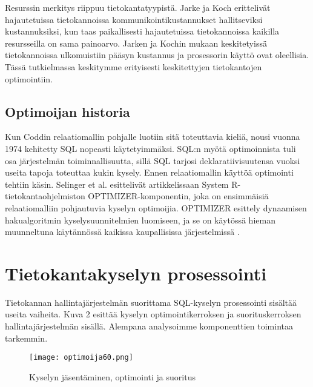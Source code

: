 \documentclass[finnish]{tktltiki2}
\theoremstyle{definition}
\theoremstyle{remark}
\begin{document}
Resurssin merkitys riippuu tietokantatyypistä. Jarke ja Koch erittelivät hajautetuissa tietokannoissa kommunikointikustannukset hallitseviksi kustannuksiksi, kun taas paikallisesti hajautetuissa tietokannoissa kaikilla resursseilla on sama painoarvo. Jarken ja Kochin mukaan keskitetyissä tietokannoissa ulkomuistiin pääsyn kustannus ja prosessorin käyttö ovat oleellisia. Tässä tutkielmassa keskitymme erityisesti keskitettyjen tietokantojen optimointiin.

\subsection{Optimoijan historia}
Kun Coddin relaatiomallin pohjalle luotiin sitä toteuttavia kieliä, nousi vuonna 1974 kehitetty SQL nopeasti käytetyimmäksi. SQL:n myötä optimoinnista tuli osa järjestelmän toiminnallisuutta, sillä SQL tarjosi deklaratiivisuutensa vuoksi useita tapoja toteuttaa kukin kysely. Ennen relaatiomallin käyttöä optimointi tehtiin käsin.
Selinger et al. esittelivät artikkelissaan \cite{selinger1979access} System R-tietokantaohjelmiston OPTIMIZER-komponentin, joka on ensimmäisiä relaatiomalliin pohjautuvia kyselyn optimoijia. OPTIMIZER esittely dynaamisen hakualgoritmin kyselysuunnitelmien luomiseen, ja se on käytössä hieman muunneltuna käytännössä kaikissa kaupallisissa järjestelmissä \cite{ioannidis1996query}. 


\section{Tietokantakyselyn prosessointi}
Tietokannan hallintajärjestelmän suorittama SQL-kyselyn prosessointi sisältää useita vaiheita. Kuva 2 esittää kyselyn optimointikerroksen ja suorituskerroksen hallintajärjestelmän sisällä. Alempana analysoimme komponenttien toimintaa tarkemmin.

\begin{figure}[!h]
  \caption{Kyselyn jäsentäminen, optimointi ja suoritus}
  \centering
    \texttt{[image: optimoija60.png]}
\end{figure}
\end{document}
